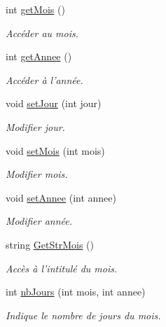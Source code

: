 \begin{DoxyCompactItemize}
int \hyperlink{class_c_date_a499fa44735a061481ed6d47e3382fa6a}{getMois} ()
\begin{DoxyCompactList}\small\item\em Accéder au mois. \item\end{DoxyCompactList}\item 
int \hyperlink{class_c_date_af37b56e430b856c1b2360cfc7c284bf0}{getAnnee} ()
\begin{DoxyCompactList}\small\item\em Accéder à l'année. \item\end{DoxyCompactList}\item 
void \hyperlink{class_c_date_a9ba9c1985bd904ae24b8d10d580c9dfa}{setJour} (int jour)
\begin{DoxyCompactList}\small\item\em Modifier jour. \item\end{DoxyCompactList}\item 
void \hyperlink{class_c_date_a1d8d023913f19ee53edb9857b5cec7e5}{setMois} (int mois)
\begin{DoxyCompactList}\small\item\em Modifier mois. \item\end{DoxyCompactList}\item 
void \hyperlink{class_c_date_a3340b3febf97ddad564a26784cd739da}{setAnnee} (int annee)
\begin{DoxyCompactList}\small\item\em Modifier année. \item\end{DoxyCompactList}\item 
string \hyperlink{class_c_date_a4182c878d46bd44c8a78c82cccc504da}{GetStrMois} ()
\begin{DoxyCompactList}\small\item\em Accès à l'intitulé du mois. \item\end{DoxyCompactList}\item 
int \hyperlink{class_c_date_a04a7801cc2f9441321735bf41602d3b2}{nbJours} (int mois, int annee)
\begin{DoxyCompactList}\small\item\em Indique le nombre de jours du mois. \item\end{DoxyCompactList}\item 

\end{DoxyCompactItemize}
